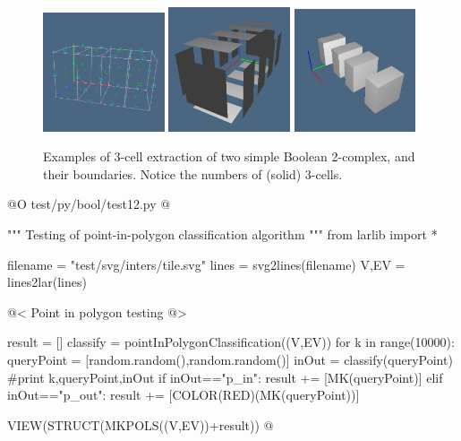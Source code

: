 \documentclass[11pt,oneside]{article}    %
\begin{document}
\begin{figure}[htbp]
   \includegraphics[height=0.332\textwidth,width=0.32\textwidth]{images/test11c1} 
   \includegraphics[height=0.332\textwidth,width=0.32\textwidth]{images/test11c2} 
   \includegraphics[height=0.332\textwidth,width=0.32\textwidth]{images/test11c3} 
   \caption{Examples of 3-cell extraction of two simple Boolean 2-complex, and their boundaries. Notice the numbers of (solid) 3-cells.}
   \label{fig:example}
\end{figure}


@O test/py/bool/test12.py @{
""" Testing of point-in-polygon classification algorithm """
from larlib import *

filename = "test/svg/inters/tile.svg"
lines = svg2lines(filename)
V,EV = lines2lar(lines)

@< Point in polygon testing @>

result = []
classify = pointInPolygonClassification((V,EV))
for k in range(10000):
    queryPoint = [random.random(),random.random()]
    inOut = classify(queryPoint)
    #print k,queryPoint,inOut
    if inOut=="p_in": result += [MK(queryPoint)]
    elif inOut=="p_out": result += [COLOR(RED)(MK(queryPoint))]

VIEW(STRUCT(MKPOLS((V,EV))+result))
@}
\end{document}
